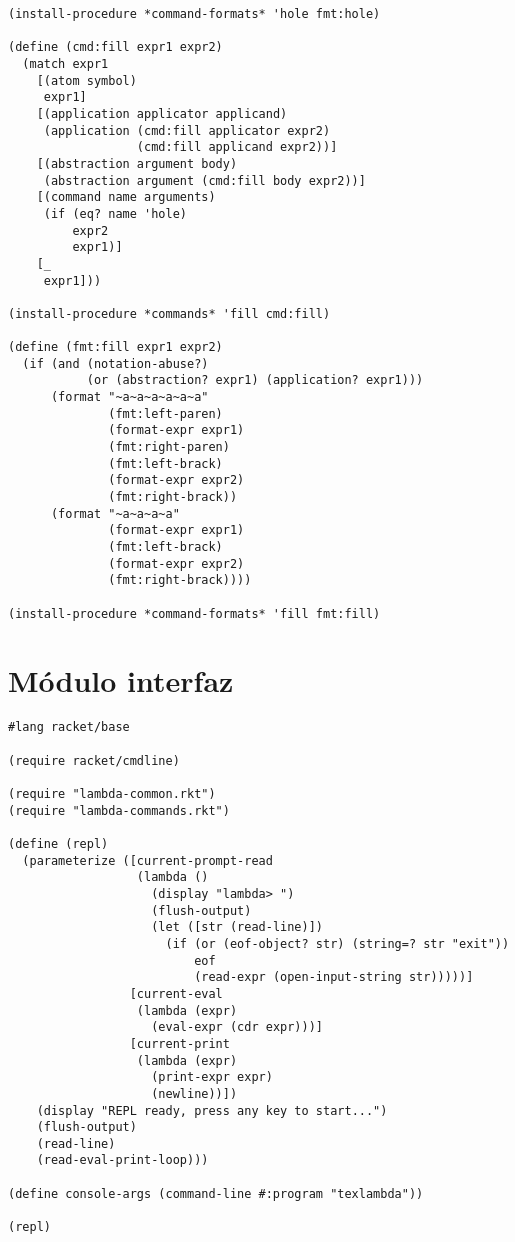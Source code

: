 \begin{lstlisting}[language=racket]
(install-procedure *command-formats* 'hole fmt:hole)

(define (cmd:fill expr1 expr2)
  (match expr1
    [(atom symbol)
     expr1]
    [(application applicator applicand)
     (application (cmd:fill applicator expr2)
                  (cmd:fill applicand expr2))]
    [(abstraction argument body)
     (abstraction argument (cmd:fill body expr2))]
    [(command name arguments)
     (if (eq? name 'hole)
         expr2
         expr1)]
    [_
     expr1]))

(install-procedure *commands* 'fill cmd:fill)

(define (fmt:fill expr1 expr2)
  (if (and (notation-abuse?)
           (or (abstraction? expr1) (application? expr1)))
      (format "~a~a~a~a~a~a"
              (fmt:left-paren)
              (format-expr expr1)
              (fmt:right-paren)
              (fmt:left-brack)
              (format-expr expr2)
              (fmt:right-brack))
      (format "~a~a~a~a"
              (format-expr expr1)
              (fmt:left-brack)
              (format-expr expr2)
              (fmt:right-brack))))

(install-procedure *command-formats* 'fill fmt:fill)
\end{lstlisting}

\section{Módulo interfaz}
\label{ap:2:interfaz}

\begin{lstlisting}[language=racket]
#lang racket/base

(require racket/cmdline)

(require "lambda-common.rkt")
(require "lambda-commands.rkt")

(define (repl)
  (parameterize ([current-prompt-read
                  (lambda ()
                    (display "lambda> ")
                    (flush-output)
                    (let ([str (read-line)])
                      (if (or (eof-object? str) (string=? str "exit"))
                          eof
                          (read-expr (open-input-string str)))))]
                 [current-eval
                  (lambda (expr)
                    (eval-expr (cdr expr)))]
                 [current-print
                  (lambda (expr)
                    (print-expr expr)
                    (newline))])
    (display "REPL ready, press any key to start...")
    (flush-output)
    (read-line)
    (read-eval-print-loop)))

(define console-args (command-line #:program "texlambda"))

(repl)
\end{lstlisting}

